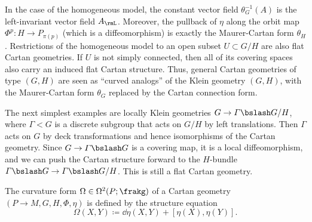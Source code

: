 \begin{example}
    In the case of the homogeneous model, the constant vector field $\theta_G^{-1}(A)$ is the left-invariant vector field $A_\rmL$. Moreover, the pullback of $\eta$ along the orbit map $\Phi^p:H\to P_{\pi(p)}$ (which is a diffeomorphism) is exactly the Maurer-Cartan form $\theta_H$. Restrictions of the homogeneous model to an open subset $U\subset G\slash H$ are also flat Cartan geometries. If $U$ is not simply connected, then all of its covering spaces also carry an induced flat Cartan structure.
     Thus, general Cartan geometries of type $(G,H)$ are seen as ``curved analogs'' of the Klein geometry $(G,H)$, with the Maurer-Cartan form $\theta_G$ replaced by the Cartan connection form.
\end{example}

\begin{example}
    The next simplest examples are locally Klein geometries $G\to \varGamma\bslash G\slash H$, where $\varGamma<G$ is a discrete subgroup that acts on $G\slash H$ by left translations. Then $\varGamma$ acts on $G$ by deck transformations and hence isomorphisms of the Cartan geometry. Since $G\to \varGamma\bslash G$ is a covering map, it is a local diffeomorphism, and we can push the Cartan structure forward to the $H$-bundle $\varGamma\bslash G \to \varGamma\bslash G\slash H$. This is still a flat Cartan geometry.
\end{example}


\begin{defn}
    The curvature form $\Omega\in\Omega^2(P;\frakg)$ of a Cartan geometry $(P\to M,G,H,\Phi,\eta)$ is defined by the structure equation 
    \[\Omega(X,Y)\coloneqq \dd\eta(X,Y)+[\eta(X),\eta(Y)].\]
\end{defn}


